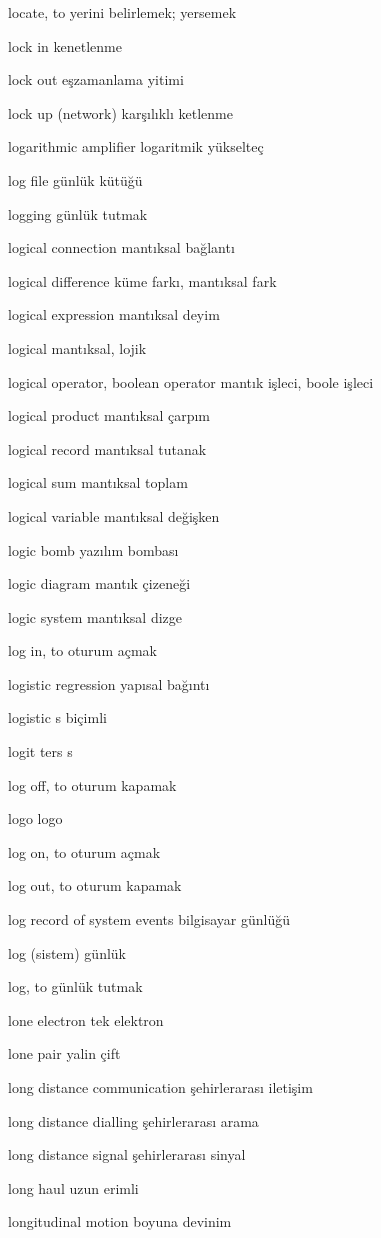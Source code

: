 \documentclass[12pt,fleqn]{article}\usepackage{../../common}
\begin{document}
locate, to yerini belirlemek; yersemek

lock in kenetlenme

lock out eşzamanlama yitimi

lock up (network) karşılıklı ketlenme

logarithmic amplifier logaritmik yükselteç

log file günlük kütüğü

logging günlük tutmak

logical connection mantıksal bağlantı

logical difference küme farkı, mantıksal fark

logical expression mantıksal deyim

logical mantıksal, lojik

logical operator, boolean operator mantık işleci, boole işleci

logical product mantıksal çarpım

logical record mantıksal tutanak

logical sum mantıksal toplam

logical variable mantıksal değişken

logic bomb yazılım bombası

logic diagram mantık çizeneği

logic system mantıksal dizge

log in, to oturum açmak

logistic regression yapısal bağıntı

logistic s biçimli

logit ters s

log off, to oturum kapamak

logo logo

log on, to oturum açmak

log out, to oturum kapamak

log record of system events bilgisayar günlüğü

log (sistem) günlük

log, to günlük tutmak

lone electron tek elektron

lone pair yalin çift

long distance communication şehirlerarası iletişim

long distance dialling şehirlerarası arama

long distance signal şehirlerarası sinyal

long haul uzun erimli

longitudinal motion boyuna devinim
\end{document}
